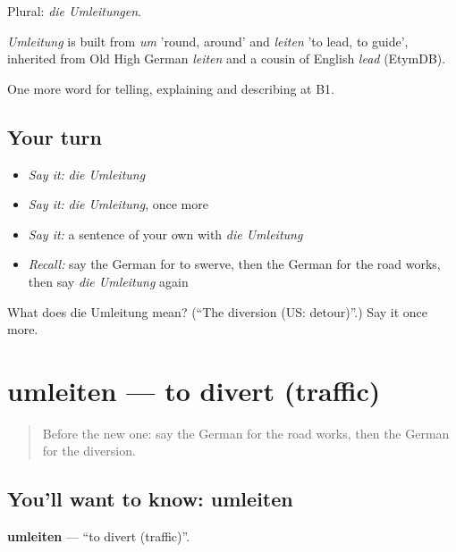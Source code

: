 Plural: \emph{die Umleitungen}.

\begin{cousinweb}
\emph{Umleitung} is built from \emph{um} 'round, around' and \emph{leiten} 'to lead, to guide', inherited from Old High German \emph{leiten} and a cousin of English \emph{lead} (EtymDB).
\end{cousinweb}

\begin{grammarlens}[title={What you've built}]
One more word for telling, explaining and describing at B1.
\end{grammarlens}

\subsection*{Your turn}
\begin{itemize}
\raggedright
  \item \emph{Say it:} \emph{die Umleitung}
  \item \emph{Say it:} \emph{die Umleitung}, once more
  \item \emph{Say it:} a sentence of your own with \emph{die Umleitung}
  \item \emph{Recall:} say the German for to swerve, then the German for the road works, then say \emph{die Umleitung} again
\end{itemize}

\begin{tcolorbox}[breakable,colback=teal!4,colframe=teal!35!black,title={Before you move on}]
What does die Umleitung mean? (\textquotedblleft{}The diversion (US: detour)\textquotedblright{}.) Say it once more.
\end{tcolorbox}
\section[umleiten]{umleiten — to divert (traffic)}

\label{lesson:GE-C409-umleiten}



\begin{quote}
Before the new one: say the German for the road works, then the German for the diversion.
\end{quote}

\subsection*{You'll want to know: umleiten}
\textbf{umleiten} — \textquotedblleft{}to divert (traffic)\textquotedblright{}.

